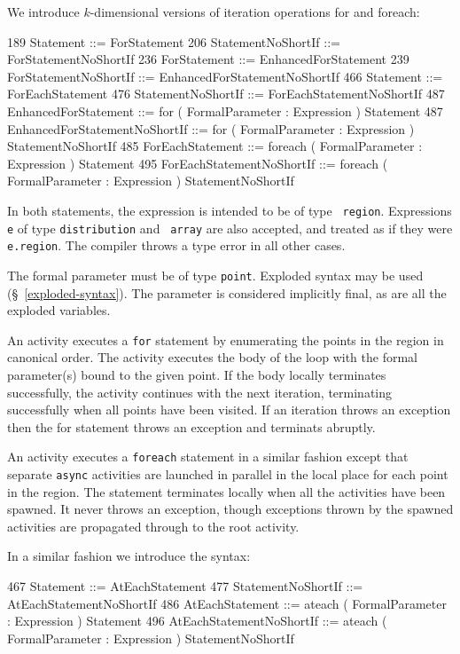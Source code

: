 {{We introduce  $k$-dimensional versions of iteration operations {\cf for} and 
{\cf foreach}:

\begin{x10}
189 Statement ::= ForStatement
206 StatementNoShortIf ::= 
      ForStatementNoShortIf
236 ForStatement ::= EnhancedForStatement
239 ForStatementNoShortIf ::= 
      EnhancedForStatementNoShortIf
466 Statement ::= ForEachStatement
476 StatementNoShortIf ::= 
      ForEachStatementNoShortIf
487 EnhancedForStatement ::= 
       for ( FormalParameter : Expression ) 
         Statement
487 EnhancedForStatementNoShortIf ::= 
       for ( FormalParameter : Expression ) 
           StatementNoShortIf
485  ForEachStatement ::= 
       foreach ( FormalParameter : Expression ) 
           Statement
495  ForEachStatementNoShortIf ::= 
        foreach ( FormalParameter : Expression ) 
          StatementNoShortIf
\end{x10}

In both statements, the expression is intended to be of type {\tt
region}.  Expressions {\tt e} of type {\tt distribution} and {\tt
array} are also accepted, and treated as if they were {\tt
e.region}. The compiler throws a type error in all other cases.

The formal parameter must be of type {\tt point}. Exploded syntax may
be used (\S~\ref{exploded-syntax}). The parameter is considered
implicitly final, as are all the exploded variables. 

An activity executes a {\tt for} statement by enumerating the points
in the region in canonical order. The activity executes the body of
the loop with the formal parameter(s) bound to the given point. If the
body locally terminates successfully, the activity continues with the
next iteration, terminating successfully when all points have been
visited. If an iteration throws an exception then the for statement
throws an exception and terminats abruptly.

An activity executes a {\tt foreach} statement in a similar fashion
except that separate {\tt async} activities are launched in parallel
in the local place for each point in the region. The statement
terminates locally when all the activities have been spawned. It never
throws an exception, though exceptions thrown by the spawned
activities are propagated through to the root activity.

In a similar fashion we introduce the syntax:
\begin{x10}
467 Statement ::= AtEachStatement
477 StatementNoShortIf ::= 
      AtEachStatementNoShortIf
486 AtEachStatement ::= 
      ateach ( FormalParameter : Expression ) 
         Statement
496 AtEachStatementNoShortIf ::= 
      ateach ( FormalParameter : Expression ) 
          StatementNoShortIf
\end{x10}

}}
